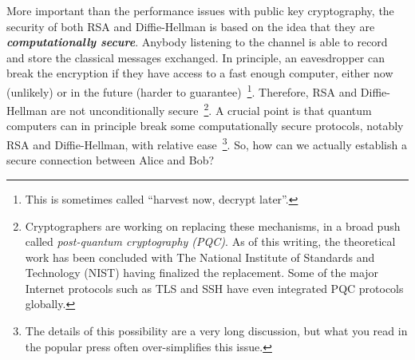 More important than the performance issues with public key cryptography, the security of both RSA and Diffie-Hellman is based on the idea that they are \textbf{\emph{computationally secure}}.
Anybody listening to the channel is able to record and store the classical messages exchanged.
In principle, an eavesdropper can break the encryption if they have access to a fast enough computer, either now (unlikely) or in the future (harder to guarantee)~\footnote{This is sometimes called ``harvest now, decrypt later''.}.
Therefore, RSA and Diffie-Hellman are not unconditionally secure~\footnote{Cryptographers are working on replacing these mechanisms, in a broad push called \emph{post-quantum cryptography (PQC)}.
As of this writing, the theoretical work has been concluded with The National Institute of Standards and Technology (NIST) having finalized the replacement. Some of the major Internet protocols such as TLS and SSH have even integrated PQC protocols globally.}.
A crucial point is that quantum computers can in principle break some computationally secure protocols, notably RSA and Diffie-Hellman, with relative ease~\footnote{The details of this possibility are a very long discussion, but what you read in the popular press often over-simplifies this issue.}.
So, how can we actually establish a secure connection between Alice and Bob?

